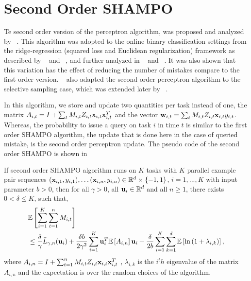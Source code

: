 \section{Second Order SHAMPO}
Te second order version of the perceptron algorithm, was proposed and analyzed by 
~\cite{CesaBianchiCoGe05}. This algorithm was adopted to the online binary classification 
settings from the ridge-regression (squared loss and Euclidean regularization) framework as described by 
~\cite{hoerl1970ridge} and ~\cite{Vovk97}, and further analyzed in ~\cite{AzouryWa01} and  ~\cite{forster2002relative}. 
It was also shown that this variation has the effect of reducing the number of mistakes compare to the first order version. 
~\cite{cesa2006worst} also adapted the second order 
perceptron algorithm to the selective sampling case, which was extended later by ~\cite{crammer2014doubly}.

In this algorithm, we store and update two quantities per task instead of one, the matrix 
$A_{i,t} = I+\sum_{t}M_{i,t}Z_{i,t}\mathbf{x}_{i,t}\mathbf{x}_{i,t}^T$ and the vector $\mathbf{w}_{i,t} = \sum_{t}M_{i,t}Z_{i,t} \mathbf{x}_{i,t}  y_{i,t}$.
Whereas, the probability to issue a query on task $i$ in time $t$ is similar to the first order SHAMPO algorithm,
the update  that is done here in the case of queried mistake, is the second order perceptron update.  
The pseudo code of the second order SHAMPO is shown in 


\begin{theorem}
  If second order SHAMPO algorithm runs on $K$ tasks with $K$ parallel example pair
  sequences
  $(\mathbf{x}_{i,1},y_{i,1}),\ldots (\mathbf{x}_{i,n},y_{i,n})\in\mathbb{R}^d\times\{-1,1\}$,
  $i=1,...,K$ with input parameter $b>0$, then for all $\gamma>0$, all
  $\mathbf{u}_{i}\in\mathbb{R}^d$ and all $n\ge1$, there exists $0<\delta\le K$, such that,
  \begin{equation*}
  \begin{split}
   &\mathbb{E}\left[{\sum_{i=1}^{K}\sum_{t=1}^{n}{M_{i,t}}}\right] \\
   &\le \frac{\delta}{\gamma}{\bar L}_{\gamma,n}(\mathbf{u}_{i})
+ \frac{\delta b}{2\gamma^2}\sum_{i=1}^{K}\mathbf{u}_i^T\mathbb{E}\left[{A_{i,n}}\right]\mathbf{u}_i+ 
\frac{\delta}{2b}\sum_{i=1}^{K}\sum_{k=1}^{d}\mathbb{E}\left[{\ln\left({1+\lambda_{i,k}}\right)}\right],
\end{split}
\end{equation*} 
 where $A_{i,n} = I+\sum_{t=1}^{n}M_{i,t}Z_{i,t}\mathbf{x}_{i,t}\mathbf{x}_{i,t}^T$ , $\lambda_{i,k}$ is the $i^th$ eigenvalue
 of the matrix $A_{i,n}$ and the expectation is over the random choices of the algorithm.
\end{theorem} \label{thm:SO_bound}

